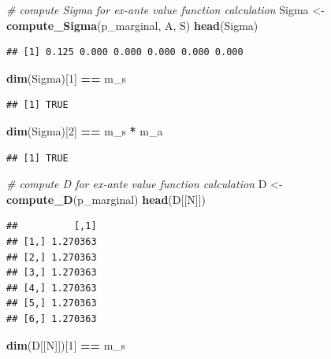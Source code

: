\documentclass[]{book}
\newenvironment{Shaded}{\begin{snugshade}}{\end{snugshade}}
\newcommand{\KeywordTok}[1]{\textcolor[rgb]{0.13,0.29,0.53}{\textbf{#1}}}
\newcommand{\DecValTok}[1]{\textcolor[rgb]{0.00,0.00,0.81}{#1}}
\newcommand{\StringTok}[1]{\textcolor[rgb]{0.31,0.60,0.02}{#1}}
\newcommand{\CommentTok}[1]{\textcolor[rgb]{0.56,0.35,0.01}{\textit{#1}}}
\newcommand{\OperatorTok}[1]{\textcolor[rgb]{0.81,0.36,0.00}{\textbf{#1}}}
\newcommand{\NormalTok}[1]{#1}
\begin{document}
\begin{Shaded}
\begin{Highlighting}[]
\CommentTok{# compute Sigma for ex-ante value function calculation}
\NormalTok{Sigma <-}\StringTok{ }\KeywordTok{compute_Sigma}\NormalTok{(p_marginal, A, S)}
\KeywordTok{head}\NormalTok{(Sigma)}
\end{Highlighting}
\end{Shaded}

\begin{verbatim}
## [1] 0.125 0.000 0.000 0.000 0.000 0.000
\end{verbatim}

\begin{Shaded}
\begin{Highlighting}[]
\KeywordTok{dim}\NormalTok{(Sigma)[}\DecValTok{1}\NormalTok{] }\OperatorTok{==}\StringTok{ }\NormalTok{m_s}
\end{Highlighting}
\end{Shaded}

\begin{verbatim}
## [1] TRUE
\end{verbatim}

\begin{Shaded}
\begin{Highlighting}[]
\KeywordTok{dim}\NormalTok{(Sigma)[}\DecValTok{2}\NormalTok{] }\OperatorTok{==}\StringTok{ }\NormalTok{m_s }\OperatorTok{*}\StringTok{ }\NormalTok{m_a}
\end{Highlighting}
\end{Shaded}

\begin{verbatim}
## [1] TRUE
\end{verbatim}

\begin{Shaded}
\begin{Highlighting}[]
\CommentTok{# compute D for ex-ante value function calculation}
\NormalTok{D <-}\StringTok{ }\KeywordTok{compute_D}\NormalTok{(p_marginal)}
\KeywordTok{head}\NormalTok{(D[[N]])}
\end{Highlighting}
\end{Shaded}

\begin{verbatim}
##          [,1]
## [1,] 1.270363
## [2,] 1.270363
## [3,] 1.270363
## [4,] 1.270363
## [5,] 1.270363
## [6,] 1.270363
\end{verbatim}

\begin{Shaded}
\begin{Highlighting}[]
\KeywordTok{dim}\NormalTok{(D[[N]])[}\DecValTok{1}\NormalTok{] }\OperatorTok{==}\StringTok{ }\NormalTok{m_s}
\end{Highlighting}
\end{Shaded}
\end{document}
